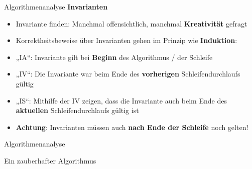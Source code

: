 \begin{frame}{Algorithmenanalyse}
	\textbf{Invarianten} \\
	\pause
	\begin{itemize}
		\item Invariante finden: Manchmal offensichtlich, manchmal \textbf{Kreativität} gefragt
		\pause
		\item Korrektheitsbeweise über Invarianten gehen im Prinzip wie \textbf{Induktion}:
		\pause
		\item „IA“: Invariante gilt bei \textbf{Beginn} des Algorithmus / der Schleife
		\pause
		\item „IV“: Die Invariante war beim Ende des \textbf{vorherigen} Schleifendurchlaufs gültig
		\pause
		\item „IS“: Mithilfe der IV zeigen, dass die Invariante auch beim Ende des \textbf{aktuellen} Schleifendurchlaufs gültig ist
		\item \textbf{Achtung}: Invarianten müssen auch \textbf{nach Ende der Schleife} noch gelten!
	\end{itemize}
\end{frame}

\iffalse  %

\begin{frame}{Algorithmenanalyse}
	\begin{exampleblock}{Ein zauberhafter Algorithmus}
		\begin{algorithm}[H]
			\DontPrintSemicolon
			\footnotesize
		\end{algorithm}
	\end{exampleblock}
\end{frame}


